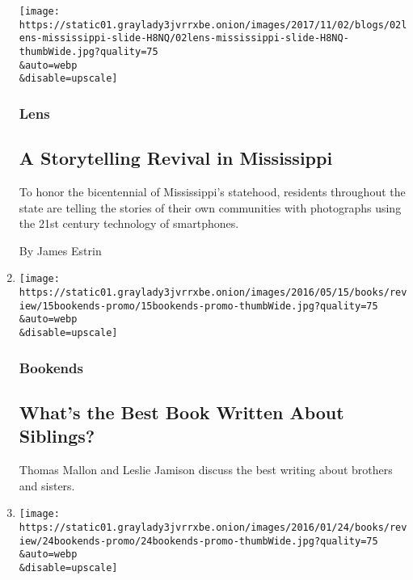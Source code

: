 \begin{enumerate}
  \texttt{[image: https://static01.graylady3jvrrxbe.onion/images/2017/11/02/blogs/02lens-mississippi-slide-H8NQ/02lens-mississippi-slide-H8NQ-thumbWide.jpg?quality=75\\\&auto=webp\\\&disable=upscale]}

  \hypertarget{lens}{%
  \subsubsection{Lens}\label{lens}}

  \hypertarget{a-storytelling-revival-in-mississippi}{%
  \subsection{A Storytelling Revival in
  Mississippi}\label{a-storytelling-revival-in-mississippi}}

  To honor the bicentennial of Mississippi's statehood, residents
  throughout the state are telling the stories of their own communities
  with photographs using the 21st century technology of smartphones.

  By James Estrin
\item
  \href{/2016/05/15/books/review/whats-the-best-book-written-about-siblings.html}{}

  \texttt{[image: https://static01.graylady3jvrrxbe.onion/images/2016/05/15/books/review/15bookends-promo/15bookends-promo-thumbWide.jpg?quality=75\\\&auto=webp\\\&disable=upscale]}

  \hypertarget{bookends}{%
  \subsubsection{Bookends}\label{bookends}}

  \hypertarget{whats-the-best-book-written-about-siblings}{%
  \subsection{What's the Best Book Written About
  Siblings?}\label{whats-the-best-book-written-about-siblings}}

  Thomas Mallon and Leslie Jamison discuss the best writing about
  brothers and sisters.
\item
  \href{/2016/01/24/books/review/is-the-writers-only-responsibility-to-his-art.html}{}

  \texttt{[image: https://static01.graylady3jvrrxbe.onion/images/2016/01/24/books/review/24bookends-promo/24bookends-promo-thumbWide.jpg?quality=75\\\&auto=webp\\\&disable=upscale]}


\end{enumerate}
